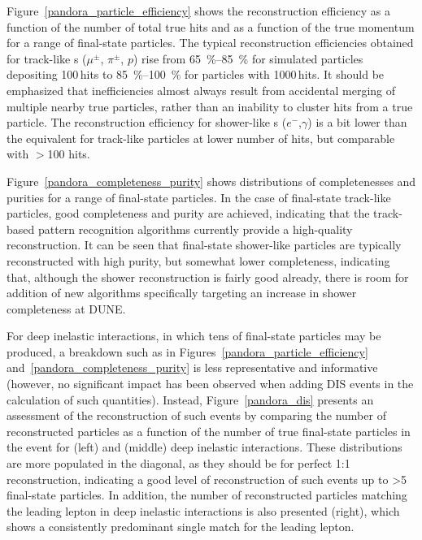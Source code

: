 Figure~\ref{pandora_particle_efficiency} shows the reconstruction efficiency as a function of the number of total true \twod hits and as a function of the true momentum for a range of final-state particles. The typical reconstruction efficiencies obtained for track-like s ($\mu^{\pm}$, $\pi^{\pm}$, $p$) rise from \SIrange{65}{85}{\%} for simulated particles depositing 100\,hits to \SIrange{85}{100}{\%} for particles with 1000\,hits. It should be emphasized that inefficiencies almost always result from accidental merging of multiple nearby true particles, rather than an inability to cluster hits from a true particle. The reconstruction efficiency for shower-like s ($e^{-}$,$\gamma$) is a bit lower than the equivalent for track-like particles at lower number of hits, but comparable with $>$100 hits.

Figure~\ref{pandora_completeness_purity} shows distributions of completenesses and purities for a range of final-state particles. In the case of final-state track-like particles, good completeness and purity are %
achieved, indicating that the track-based pattern recognition algorithms currently provide a high-quality reconstruction. It can be seen that final-state shower-like particles are typically reconstructed with high purity, but somewhat lower completeness, indicating that, although the shower reconstruction is fairly good already, there is room for addition of new algorithms specifically targeting an increase in shower completeness at DUNE.

For deep inelastic interactions, in which tens of final-state particles may be produced, a breakdown such as in Figures~\ref{pandora_particle_efficiency} and~\ref{pandora_completeness_purity} is less representative and informative (however, no significant impact has been observed when adding DIS events in the calculation of such quantities). Instead, Figure~\ref{pandora_dis} presents an assessment of the reconstruction of such events %
by comparing the number of reconstructed particles as a function of the number of true final-state particles in the event for  (left) and  (middle) deep inelastic interactions. These distributions are more populated in the diagonal, as they should be for perfect 1:1 reconstruction, indicating a good level of reconstruction of such events up to >5 final-state particles. In addition, the number of reconstructed particles matching the leading lepton in  deep inelastic interactions is also presented (right), which shows a consistently predominant single match for the leading lepton. 

